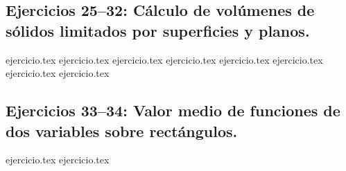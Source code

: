 \subsection*{Ejercicios 25--32: Cálculo de volúmenes de sólidos limitados por superficies y planos.}
\begin{enumerate}
    \setcounter{enumi}{24}
    {ejercicio.tex}
    {ejercicio.tex}
    {ejercicio.tex}
    {ejercicio.tex}
    {ejercicio.tex}
    {ejercicio.tex}
    {ejercicio.tex}
    {ejercicio.tex}
\end{enumerate}

\subsection*{Ejercicios 33--34: Valor medio de funciones de dos variables sobre rectángulos.}
\begin{enumerate}
    \setcounter{enumi}{32}
    {ejercicio.tex}
    {ejercicio.tex}
\end{enumerate}
